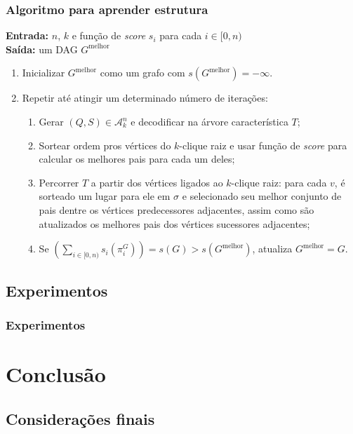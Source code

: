 \documentclass{beamer}
\begin{document}
  \begin{frame}
    \frametitle{Algoritmo para aprender estrutura}

    {\footnotesize
      \textbf{Entrada:} $n$, $k$ e função de \emph{score} $s_i$ para cada $i \in [0, n)$\\
      \textbf{Saída:} um DAG $G^{\text{melhor}}$

      \begin{enumerate}
        \item Inicializar $G^{\text{melhor}}$ como um grafo com $s(G^{\text{melhor}}) = -\infty$.
        \item Repetir até atingir um determinado número de iterações:
          \begin{enumerate}
            \item Gerar $(Q, S) \in \mathcal{A}^n_k$ e decodificar na árvore característica $T$;
            \item Sortear ordem pros vértices do $k$-clique raiz e usar função de \emph{score} para calcular os melhores pais para cada um deles;
            \item Percorrer $T$ a partir dos vértices ligados ao $k$-clique raiz: para cada $v$, é sorteado um lugar para ele em $\sigma$ e selecionado seu melhor conjunto de pais dentre os vértices predecessores adjacentes, assim como são atualizados os melhores pais dos vértices sucessores adjacentes;
            \item Se $\left(\sum_{i \in [0,n)} s_i(\pi^G_{i})\right) = s(G) > s(G^{\text{melhor}})$, atualiza $G^{\text{melhor}} = G$.
          \end{enumerate}
      \end{enumerate}
    }
  \end{frame}

  \subsection{Experimentos}

  \begin{frame}
    \frametitle{Experimentos}

  \end{frame}

  \section{Conclusão}

  \subsection{Considerações finais}
\end{document}

